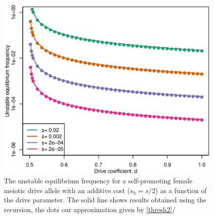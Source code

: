 \documentclass[12pt,letterpaper]{article}
\begin{document}
\begin{figure}
\includegraphics[width = 0.8 \textwidth]{Figures/bistable_x_vs_d_additive_s.eps} 
\caption{The unstable equilibrium frequency for a self-promoting
  female meiotic drive allele with an additive cost ($s_h=s/2$) as a
  function of the drive parameter. The solid line shows results
  obtained using the recursion, the dots our approximation given by \eqref{thresh2}/}  \label{bistable_additive}
\end{figure}
\end{document}
